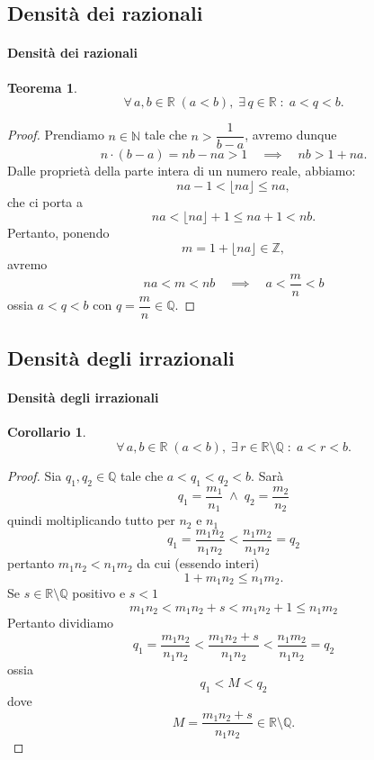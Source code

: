 \documentclass{article}
\theoremstyle{plain}
\newtheorem{thm}{Teorema}[section]
\newtheorem{cor}{Corollario}
\theoremstyle{definition}
\theoremstyle{remark}
\begin{document}
\subsection{Densità dei razionali}

\vspace{10pt}

\paragraph{Densità dei razionali}
\begin{bxthm}
\begin{thm}
    \[\forall\, a,b\in\mathbb{R}\;(a<b),\;\exists\, q\in\mathbb{R}\;:\;a<q<b.\] 
\end{thm}
\end{bxthm}
\begin{proof}
    Prendiamo $n\in\mathbb{N}$ tale che $n>\dfrac{1}{b-a}$, avremo dunque
    \[n\cdot(b-a)=nb-na>1\quad \implies\quad nb>1+na.\]
    Dalle proprietà della parte intera di un numero reale, abbiamo:
    \[na-1<\lfloor na\rfloor\leq na,\] che ci porta a \[na< \lfloor na\rfloor+1\leq na+1<nb.\]
    Pertanto, ponendo \[m=1+\lfloor na \rfloor\in\mathbb{Z},\] avremo 
    \[ na<m<nb\quad \implies\quad a<\frac{m}{n}<b \]
    ossia $a<q<b$ con $q=\dfrac{m}{n}\in\mathbb{Q}$.
\end{proof}

\vspace{10pt}

\subsection{Densità degli irrazionali}

\vspace{10pt}

\paragraph{Densità degli irrazionali}
\begin{bxthm}
\begin{cor}
    \[\forall\, a,b \in \mathbb{R}\;(a<b),\;\exists\, r \in \mathbb{R}\setminus\mathbb{Q}\;:\;a<r<b.\]
\end{cor}
\end{bxthm}
\begin{proof}
    Sia $q_{1},q_{2} \in \mathbb{Q}$ tale che $a<q_{1}<q_{2}<b$.    
    Sarà \[q_{1}=\dfrac{m_{1}}{n_{1}} \; \land \; q_{2}=\dfrac{m_{2}}{n_{2}}\]
    quindi moltiplicando tutto per $n_2$ e $n_1$
    \[q_{1}=\dfrac{m_{1}n_{2}}{n_{1}n_{2}}<\dfrac{n_{1}m_{2}}{n_{1}n_{2}}=q_{2}\]
    pertanto $m_1n_2<n_1m_2$ da cui (essendo interi)
    \[1+m_1n_2\leq n_1m_2.\]
    Se $s\in\mathbb{R}\setminus\mathbb{Q}$ positivo e $s<1$
    \[m_1n_2<m_1n_2+s<m_1n_2+1\leq n_1m_2\]
    Pertanto dividiamo 
    \[q_1=\dfrac{m_1n_2}{n_1n_2}<\dfrac{m_1n_2+s}{n_1n_2}<\dfrac{n_1m_2}{n_1n_2}=q_2\]
    ossia \[q_1<M<q_2\]
    dove \[M=\dfrac{m_1n_2+s}{n_1n_2}\in\mathbb{R}\setminus\mathbb{Q}.\]
\end{proof}
\end{document}
